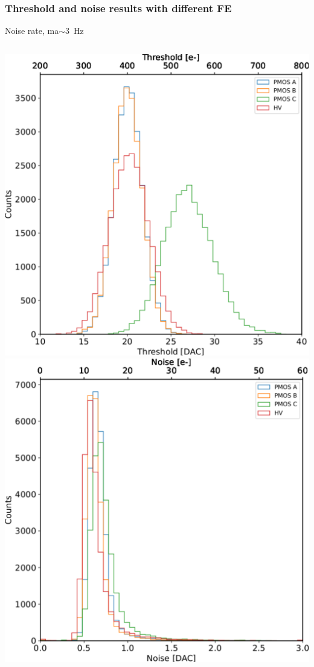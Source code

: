     \begin{frame}
        \frametitle{Threshold and noise results with different FE}
        Noise rate, ma$\sim$\SI{3}{Hz}
        \begin{columns}
                \includegraphics[width=1.1\linewidth]{figures/charaterization/threshold_histogram.pdf}
                \includegraphics[width=1.1\linewidth]{figures/charaterization/noise_histogram.pdf} 

\end{columns}
\end{frame}
